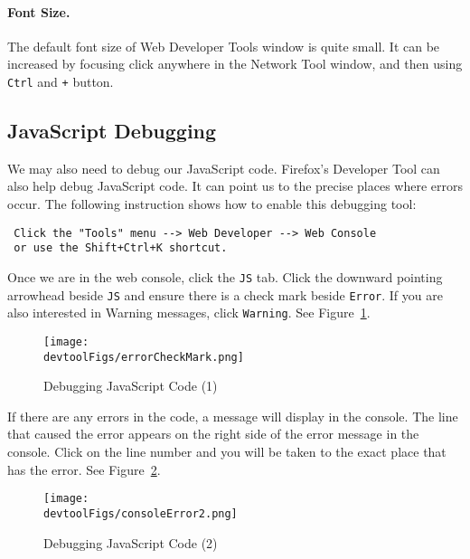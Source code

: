 \paragraph{Font Size.} The default font size of Web Developer Tools window is quite small. It
can be increased by focusing click anywhere in the Network Tool window, and then using
\texttt{Ctrl} and \texttt{+} button.


\subsection{JavaScript Debugging}
\label{web:sec:jsdebugging}

We may also need to debug our JavaScript code. Firefox's Developer Tool can also help debug
JavaScript code. It can point us to the precise places where errors occur. The following
instruction shows how to enable this debugging tool:

\begin{lstlisting}
 Click the "Tools" menu --> Web Developer --> Web Console
 or use the Shift+Ctrl+K shortcut.
\end{lstlisting}


Once we are in the web console, click the {\tt JS} tab. Click the downward pointing arrowhead
beside {\tt JS} and ensure there is a check mark beside {\tt Error}. If you are also interested
in Warning messages, click {\tt Warning}. See Figure~\ref{devtool:fig:errocheckmark}.


\begin{figure}[htb]
\begin{center}
  \texttt{[image: \\devtoolFigs/errorCheckMark.png]}
\end{center}
\caption{Debugging JavaScript Code (1)}
\label{devtool:fig:errocheckmark}
\end{figure}
 

If there are any errors in the code, a message will display in the console. The line that
caused the error appears on the right side of the error message in the console. Click on the
line number and you will be taken to the exact place that has the error.
See Figure~\ref{devtool:fig:console}.


\begin{figure}[htb]
\begin{center}
  \texttt{[image: \\devtoolFigs/consoleError2.png]}
\end{center}
\caption{Debugging JavaScript Code (2)}
\label{devtool:fig:console}
\end{figure}
 




 
